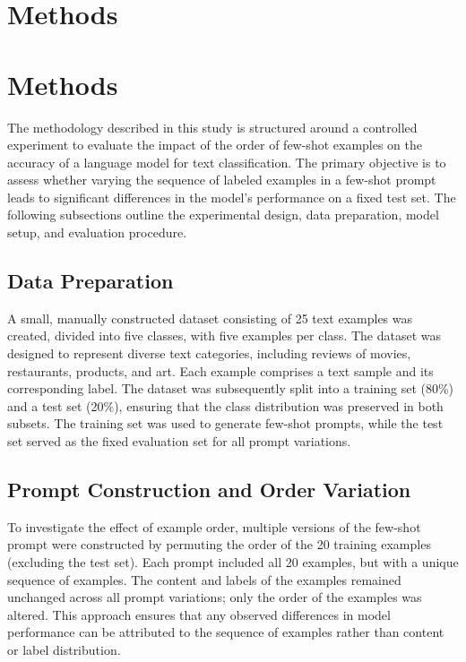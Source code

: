 \documentclass{article}
\begin{document}
\section{Methods}
\section*{Methods}

The methodology described in this study is structured around a controlled experiment to evaluate the impact of the order of few-shot examples on the accuracy of a language model for text classification. The primary objective is to assess whether varying the sequence of labeled examples in a few-shot prompt leads to significant differences in the model's performance on a fixed test set. The following subsections outline the experimental design, data preparation, model setup, and evaluation procedure.

\subsection*{Data Preparation}

A small, manually constructed dataset consisting of 25 text examples was created, divided into five classes, with five examples per class. The dataset was designed to represent diverse text categories, including reviews of movies, restaurants, products, and art. Each example comprises a text sample and its corresponding label. The dataset was subsequently split into a training set (80\%) and a test set (20\%), ensuring that the class distribution was preserved in both subsets. The training set was used to generate few-shot prompts, while the test set served as the fixed evaluation set for all prompt variations.

\subsection*{Prompt Construction and Order Variation}

To investigate the effect of example order, multiple versions of the few-shot prompt were constructed by permuting the order of the 20 training examples (excluding the test set). Each prompt included all 20 examples, but with a unique sequence of examples. The content and labels of the examples remained unchanged across all prompt variations; only the order of the examples was altered. This approach ensures that any observed differences in model performance can be attributed to the sequence of examples rather than content or label distribution.
\end{document}
